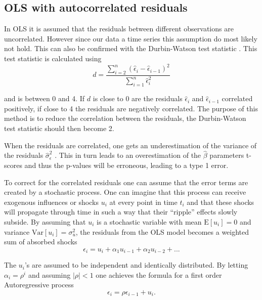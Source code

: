 
\subsection{OLS with autocorrelated residuals}

In OLS it is assumed that the residuals between different observations are uncorrelated. However since our data a time series this assumption do most likely not hold. This can also be confirmed with the Durbin-Watson test statistic \cite[p.~173]{autocorrelation-kousgaard}. This test statistic is calculated using
\begin{equation}
d = \frac{\sum_{i=2}^n \left( \hat{\epsilon}_i - \hat{\epsilon}_{i-1} \right)^2}{ \sum_{i=1}^n\hat{\epsilon}_i^2 }
\end{equation}

and is between 0 and 4. If $d$ is close to 0 are the residuals $\hat{\epsilon}_i$ and $\hat{\epsilon}_{i-1}$ correlated positively, if close to 4 the residuals are negatively correlated. The purpose of this method is to reduce the correlation between the residuals, the Durbin-Watson test statistic should then become 2.

When the residuals are correlated, one gets an underestimation  of the variance of the residuals $\hat{\sigma}_\epsilon^2$ \cite{wiki-autocorrelation}. This in turn leads to an overestimation of the $\hat{\beta}$ parameters t-scores and thus the p-values will be erroneous, leading to a type 1 error.

To correct for the correlated residuals one can assume that the error terms are created by a stochastic process. 
One can imagine that this process can receive exogenous influences or shocks $u_i$ at every point in time $t_i$ and that these shocks will propagate through time in such a way that their ``ripple'' effects slowly subside. 
By assuming that $u_i$ is a stochastic variable with mean $\mathrm{E}[u_i]=0$ and variance $\mathrm{Var}[u_i]=\sigma_u^2$, the residuals from the OLS model becomes a weighted sum of absorbed shocks 
\begin{equation}
\epsilon_i=u_i+\alpha_1 u_{i-1}+\alpha_2 u_{i-2}+...
\end{equation}

The $u_i$'s are assumed to be independent and identically distributed.
By letting $\alpha_i=\rho^i$ and assuming $|\rho|<1$ one achieves the formula for a first order Autoregressive process
\begin{equation}
\epsilon_i=\rho \epsilon_{i-1}+u_i.
\end{equation}

